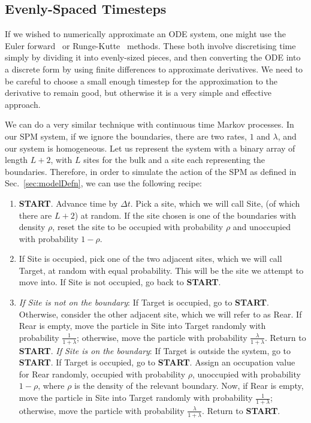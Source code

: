 \subsection{Evenly-Spaced Timesteps} \label{sec:evenTimesteps}

If we wished to numerically approximate an ODE system, one might use the Euler forward~\cite{biswas2013} or 
Runge-Kutte~\cite{zingg1999} methods. These both involve discretising time simply by dividing it into evenly-sized
pieces, and then converting the ODE into a discrete form by using finite differences to
approximate derivatives. We need to be careful to choose a small enough timestep for
the approximation to the derivative to remain good, but otherwise it is a very simple and 
effective approach.

We can do a very similar technique with continuous time Markov processes. In our SPM system,
if we ignore the boundaries, there are two rates, $1$ and $\lambda$, and our system is 
homogeneous. Let us represent the system with a binary array of length $L+2$, with $L$ sites for the bulk
and a site each representing the boundaries. Therefore, in order to simulate the action of the SPM as
defined in Sec.~\ref{sec:modelDefn}, we can use the following recipe:
\begin{enumerate}
 \item \textbf{START}. Advance time by $\Delta t$. Pick a site, which we will call
 Site,
 (of which there are $L+2$) at random. If the site chosen is one of the boundaries with density $\rho$,
 reset the site to be occupied with probability $\rho$ and unoccupied with probability $1-\rho$.
 \item If Site is occupied, pick one of the two adjacent sites, which we will call Target, at random with equal probability.
 This will be the site we attempt to move into. If Site is not occupied, go back to \textbf{START}.
 \item \textit{If Site is not on the boundary}: If Target is occupied, go to \textbf{START}. Otherwise, consider the other adjacent site,
 which we will refer to as Rear. If Rear is empty, move the particle in Site into Target 
 randomly with
 probability $\frac{1}{1+\lambda}$; otherwise, move the particle with probability
 $\frac{\lambda}{1+\lambda}$. Return to \textbf{START}. 
 \newline \textit{If Site is on the boundary}: If Target is outside the system, go to \textbf{START}.
 If Target is occupied, go to \textbf{START}. Assign an occupation value for Rear randomly, occupied
 with probability $\rho$, unoccupied with probability $1-\rho$, where $\rho$ is the density of the relevant
 boundary. Now, if Rear is empty, move the particle in Site into Target 
 randomly with  probability $\frac{1}{1+\lambda}$; otherwise, move the particle with probability
 $\frac{\lambda}{1+\lambda}$. Return to \textbf{START}.
\end{enumerate}
